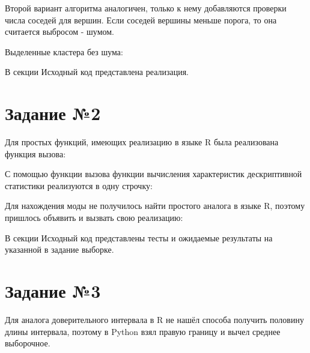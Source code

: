 \documentclass{article} %
\begin{document}
Второй вариант алгоритма аналогичен,
только к нему добавляются проверки числа соседей для вершин.
Если соседей вершины меньше порога, то она считается выбросом - шумом.

\clearpage

Выделенные кластера без шума:

\noindent{}

В секции Исходный код представлена реализация.

\section{Задание №2}
Для простых функций, имеющих реализацию в языке R была реализована функция вызова:
%

С помощью функции вызова функции вычисления характеристик дескриптивной статистики реализуются в одну строчку:
%

Для нахождения моды не получилось найти простого аналога в языке R, поэтому пришлось объявить и вызвать свою реализацию:
%

В секции Исходный код представлены тесты и ожидаемые результаты на указанной в задание выборке.

\section{Задание №3}
Для аналога доверительного интервала в R не нашёл способа получить половину длины интервала, поэтому в Python взял правую границу и вычел среднее выборочное.
\end{document}
